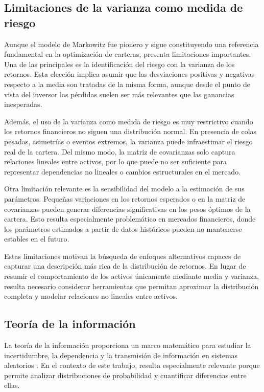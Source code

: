 \subsection{Limitaciones de la varianza como medida de riesgo}

Aunque el modelo de Markowitz fue pionero y sigue constituyendo una referencia fundamental en la optimización de carteras, presenta limitaciones importantes. Una de las principales es la identificación del riesgo con la varianza de los retornos. Esta elección implica asumir que las desviaciones positivas y negativas respecto a la media son tratadas de la misma forma, aunque desde el punto de vista del inversor las pérdidas suelen ser más relevantes que las ganancias inesperadas.

Además, el uso de la varianza como medida de riesgo es muy restrictivo cuando los retornos financieros no siguen una distribución normal. En presencia de colas pesadas, asimetrías o eventos extremos, la varianza puede infraestimar el riesgo real de la cartera. Del mismo modo, la matriz de covarianzas solo captura relaciones lineales entre activos, por lo que puede no ser suficiente para representar dependencias no lineales o cambios estructurales en el mercado.

Otra limitación relevante es la sensibilidad del modelo a la estimación de sus parámetros. Pequeñas variaciones en los retornos esperados o en la matriz de covarianzas pueden generar diferencias significativas en los pesos óptimos de la cartera. Esto resulta especialmente problemático en mercados financieros, donde los parámetros estimados a partir de datos históricos pueden no mantenerse estables en el futuro.

Estas limitaciones motivan la búsqueda de enfoques alternativos capaces de capturar una descripción más rica de la distribución de retornos. En lugar de resumir el comportamiento de los activos únicamente mediante media y varianza, resulta necesario considerar herramientas que permitan aproximar la distribución completa y modelar relaciones no lineales entre activos.

\subsection{Teoría de la información}

La teoría de la información proporciona un marco matemático para estudiar la incertidumbre, la dependencia y la transmisión de información en sistemas aleatorios \cite{cover2006elements}. En el contexto de este trabajo, resulta especialmente relevante porque permite analizar distribuciones de probabilidad y cuantificar diferencias entre ellas.

